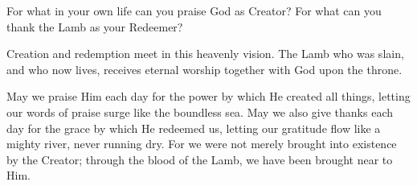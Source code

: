 \begin{ReaderQuestion}
For what in your own life can you praise God as Creator? For what can you thank the Lamb as your Redeemer?
\end{ReaderQuestion}


Creation and redemption meet in this heavenly vision. The Lamb who was slain, and who now lives, receives eternal worship together with God upon the throne.

May we praise Him each day for the power by which He created all things, letting our words of praise surge like the boundless sea. May we also give thanks each day for the grace by which He redeemed us, letting our gratitude flow like a mighty river, never running dry.
For we were not merely brought into existence by the Creator; through the blood of the Lamb, we have been brought near to Him. 
